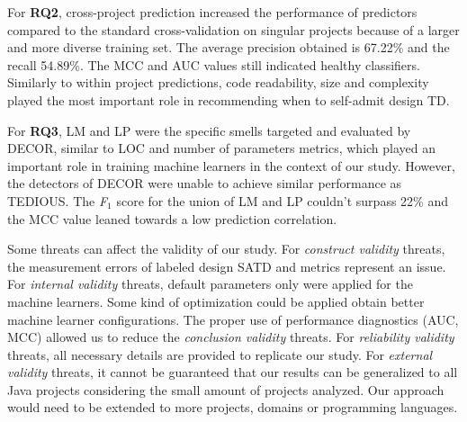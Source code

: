 For \textbf{RQ2}, cross-project prediction increased the performance of predictors compared to the standard cross-validation on singular projects because of a larger and more diverse training set. The average precision obtained is 67.22\% and the recall 54.89\%. The MCC and AUC values still indicated healthy classifiers. Similarly to within project predictions, code readability, size and complexity played the most important role in recommending when to self-admit design \ac{TD}. \par

For \textbf{RQ3}, \ac{LM} and \ac{LP} were the specific smells targeted and evaluated by \ac{DECOR}, similar to \ac{LOC} and number of parameters metrics, which played an important role in training machine learners in the context of our study. However, the detectors of \ac{DECOR} were unable to achieve similar performance as \ac{TEDIOUS}. The \emph{F$_{1}$} score for the union of \ac{LM} and \ac{LP} couldn't surpass 22\% and the \ac{MCC} value leaned towards a low prediction correlation. \par


Some threats can affect the validity of our study. For \emph{construct validity} threats, the measurement errors of labeled design \ac{SATD} and metrics represent an issue. For \emph{internal validity} threats, default parameters only were applied for the machine learners. Some kind of optimization could be applied obtain better machine learner configurations. The proper use of performance diagnostics (\ac{AUC}, \ac{MCC}) allowed us to reduce the \emph{conclusion validity} threats. For \emph{reliability validity} threats, all necessary details are provided to replicate our study. For \emph{external validity} threats, it cannot be guaranteed that our results can be generalized to all Java projects considering the small amount of projects analyzed. Our approach would need to be extended to more projects, domains or programming languages. \par

